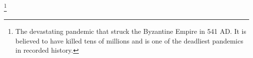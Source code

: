 \footnote{The devastating pandemic that struck the Byzantine Empire in 541 AD. It is believed to have killed tens of millions and is one of the deadliest pandemics in recorded history.}